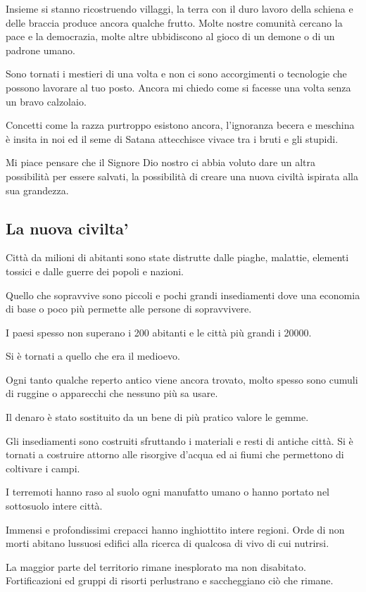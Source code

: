 \documentclass[12pt,a4paper,twoside,openany]{book}
\begin{document}
\begin{multicols}{2}
Insieme si stanno ricostruendo villaggi, la terra con il duro lavoro della schiena e delle braccia produce ancora qualche frutto.
Molte nostre comunità cercano la pace e la democrazia, molte altre ubbidiscono al gioco di un demone o di un padrone umano.

Sono tornati i mestieri di una volta e non ci sono accorgimenti o tecnologie che possono lavorare al tuo posto. Ancora mi chiedo come si facesse una volta senza un bravo calzolaio. 

Concetti come la razza purtroppo esistono ancora, l'ignoranza becera e meschina è insita in noi ed il seme di Satana attecchisce vivace tra i bruti e gli stupidi.

Mi piace pensare che il Signore Dio nostro ci abbia voluto dare un altra possibilità per essere salvati, la possibilità di creare una nuova civiltà ispirata alla sua grandezza.

\subsection{La nuova civilta'}

Città da milioni di abitanti sono state distrutte dalle piaghe, malattie, elementi tossici e dalle guerre dei popoli e nazioni.

Quello che sopravvive sono piccoli e pochi grandi insediamenti dove una economia di base o poco più permette alle persone di sopravvivere.

I paesi spesso non superano i 200 abitanti e le città più grandi i 20000.

Si è tornati a quello che era il medioevo.

Ogni tanto qualche reperto antico viene ancora trovato, molto spesso sono cumuli di ruggine o apparecchi che nessuno più sa usare.

Il denaro è stato sostituito da un bene di più pratico valore le gemme.

Gli insediamenti sono costruiti sfruttando i materiali e resti di antiche città. Si è tornati a costruire attorno alle risorgive d'acqua ed ai fiumi che permettono di coltivare i campi.

I terremoti hanno raso al suolo ogni manufatto umano o hanno portato nel sottosuolo intere città.

Immensi e profondissimi crepacci hanno inghiottito intere regioni. Orde di non morti abitano lussuosi edifici alla ricerca di qualcosa di vivo di cui nutrirsi.

La maggior parte del territorio rimane inesplorato ma non disabitato. Fortificazioni ed gruppi di risorti perlustrano e saccheggiano ciò che rimane.


\end{multicols}
\end{document}
